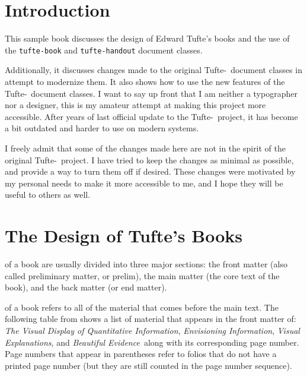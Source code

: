 \documentclass[a4paper]{tufte-book}
\newcommand{\VDQI}{\textit{The Visual Display of Quantitative Information}\xspace}
\newcommand{\EI}{\textit{Envisioning Information}\xspace}
\newcommand{\VE}{\textit{Visual Explanations}\xspace}
\newcommand{\BE}{\textit{Beautiful Evidence}\xspace}
\newcommand{\TL}{Tufte-\hologo{LaTeX}\xspace}
\newcommand{\doccls}[1]{\texttt{#1}}
\begin{document}
\vfill
\vfill


\cleardoublepage{}
\chapter*{Introduction}\label{ch:introduction}
\thispagestyle{fancy}
This sample book discusses the design of Edward Tufte's books%
\cite{Tufte2001,Tufte1990,Tufte1997,Tufte2006}
and the use of the \doccls{tufte-book} and \doccls{tufte-handout} document classes.

Additionally, it discusses changes made to the original \TL\ document classes in attempt to modernize them.
It also shows how to use the new features of the \TL\ document classes.
I want to say up front that I am neither a typographer nor a designer, this is my amateur attempt at making this project more accessible.
After years of last official update to the \TL\ project, it has become a bit outdated and harder to use on modern systems.

I freely admit that some of the changes made here are not in the spirit of the original \TL\ project.
I have tried to keep the changes as minimal as possible, and provide a way to turn them off if desired.
These changes were motivated by my personal needs to make it more accessible to me, and I hope they will be useful to others as well.


\mainmatter{}


\chapter{The Design of Tufte's Books}\label{ch:design-tuftes-books}
 of a book are usually divided into three major sections:
the front matter (also called preliminary matter, or prelim),
the main matter (the core text of the book),
and the back matter (or end matter).

 of a book refers to all of the material that comes before the main text.
The following table from shows a list of material that appears in the front matter of: \VDQI, \EI, \VE, and \BE\ along with its corresponding page number.
Page numbers that appear in parentheses refer to folios that do not have a printed page number (but they are still counted in the page number sequence).
\end{document}
